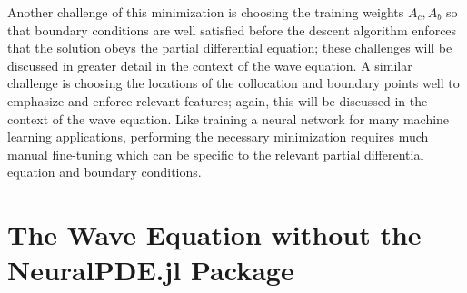 \documentclass[11pt]{article}
\newcommand{\1}{\mathbf 1}
\begin{document}
Another challenge of this minimization is choosing the training weights $A_c, A_b$ so that boundary conditions are well satisfied before the descent algorithm enforces that the solution obeys the partial differential equation; these challenges will be discussed in greater detail in the context of the wave equation.
A similar challenge is choosing the locations of the collocation and boundary points well to emphasize and enforce relevant features; again, this will be discussed in the context of the wave equation.
Like training a neural network for many machine learning applications, performing the necessary minimization requires much manual fine-tuning which can be specific to the relevant partial differential equation and boundary conditions.


\section{The Wave Equation without the NeuralPDE.jl Package}
\end{document}

